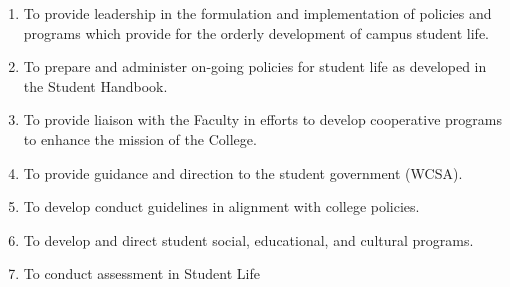\documentclass[letterpaper, 11pt]{article}
\begin{document}
\begin{enumerate}[label=\alph*)]
{\begin{enumerate}[label=\arabic*)]
{									\begin{enumerate}[label=(\alph*)]
										\item{To provide leadership in the formulation and implementation of policies and programs which provide for the orderly development of campus student life.}
										\item{To prepare and administer on-going policies for student life as developed in the Student Handbook.}
										\item{To provide liaison with the Faculty in efforts to develop cooperative programs to enhance the mission of the College.}
										\item{To provide guidance and direction to the student government (WCSA).}
										\item{To develop conduct guidelines in alignment with college policies.}
										\item{To develop and direct student social, educational, and cultural programs.}
										\item{To conduct assessment in Student Life}
									\end{enumerate}
								}
							\end{enumerate}
						}
					\end{enumerate}
\end{document}
